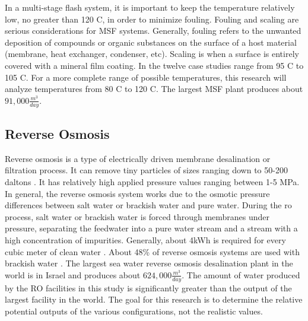 In a multi-stage flash system, it is important to keep the temperature relatively low, no greater than 120 \degree C, in order to minimize fouling. Fouling and scaling are serious considerations for MSF systems.  Generally, fouling refers to the unwanted deposition of compounds or organic substances on the surface of a host material (membrane, heat exchanger, condenser, etc)\cite{Khayet2016}. Scaling is when a surface is entirely covered with a mineral film coating. In \cite{El-Dessouky2016} the twelve case studies range from 95 \degree C to 105 \degree C. For a more complete range of possible temperatures, this research will analyze temperatures from 80 \degree C to 120 \degree C. The largest MSF plant produces about $91,000\frac{m^3}{day}$.




\subsection{Reverse Osmosis}

Reverse osmosis is a type of electrically driven membrane desalination or filtration process. It can remove tiny particles of sizes ranging down to 50-200 daltons \cite{Pangarkar2011}. It has relatively high applied pressure values ranging between 1-5 MPa. In general, the reverse osmosis system works due to the osmotic pressure differences between salt water or brackish water and pure water. During the \ac{ro} process, salt water or brackish water is forced through membranes under pressure, separating the feedwater into a pure water stream and a stream with a high concentration of impurities.  Generally, about 4kWh is required for every cubic meter of clean water \cite{Pangarkar2011}. About 48\% of reverse osmosis systems are used with brackish water \cite{Pangarkar2011}. The largest sea water reverse osmosis desalination plant in the world is in Israel and produces about $624,000\frac{m^3}{day}$. The amount of water produced by the RO facilities in this study is significantly greater than the output of the largest facility in the world.  The goal for this research is to determine the relative potential outputs of the various configurations, not the realistic values.





